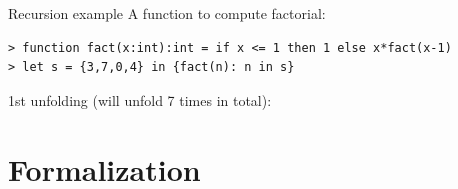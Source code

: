 \documentclass{beamer}
\begin{document}
%


\begin{frame}[fragile]{Recursion example}
A function to compute factorial:
\begin{lstlisting}[style=nesl-style]
> function fact(x:int):int = if x <= 1 then 1 else x*fact(x-1)
> let s = {3,7,0,4} in {fact(n): n in s}
\end{lstlisting}
\pause
1st unfolding (will unfold 7 times in total):
	
    
\end{frame}


\def\fmsnesl{SNESL\textsubscript{0}}
\def\fmsvcode{SVCODE\textsubscript{0}}

\def\seval#1#2#3#4#5{\left\langle#1,#2 \right\rangle \Da^{#3} #4 \ \$ \ #5} 
\def\sevalf#1#2#3#4{{\lcall}(#1,...,#2) \Da^{#3} #4}
\def\sevalfg#1#2#3#4{#1(#2) \Da^{#3} #4}
\def\Eval#1#2#3#4{#1 \Env #2 \Eva #3 \ \$ \ #4 } 
\def\Type#1#2#3{#1 \Env #2 : #3 } 
\def\Typef#1#2#3{#1 : (#2) \rightarrow #3}
\def\TypeV#1#2{#1 : #2}
\def\ValRep#1#2#3{ #1 \mathrel{\triangleright_{#2}} #3}
\newcommand{\blocke}[3]{\lcall(#1,...,#2) \Eva #3}


\section{Formalization}
\end{document}
